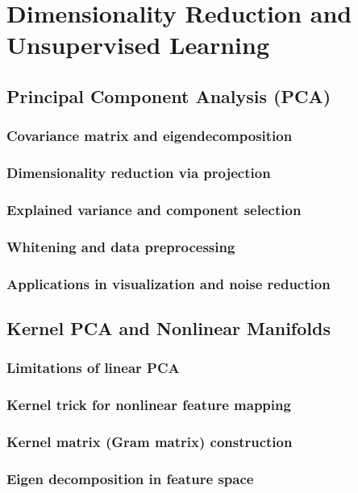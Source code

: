 \chapter{Dimensionality Reduction and Unsupervised Learning}

\section{Principal Component Analysis (PCA)}
\subsection{Covariance matrix and eigendecomposition}
\subsection{Dimensionality reduction via projection}
\subsection{Explained variance and component selection}
\subsection{Whitening and data preprocessing}
\subsection{Applications in visualization and noise reduction}

\section{Kernel PCA and Nonlinear Manifolds}
\subsection{Limitations of linear PCA}
\subsection{Kernel trick for nonlinear feature mapping}
\subsection{Kernel matrix (Gram matrix) construction}
\subsection{Eigen decomposition in feature space}

